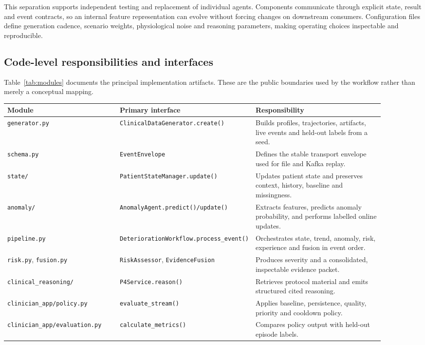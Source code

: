 \documentclass[11pt,a4paper]{article}
\begin{document}
This separation supports independent testing and replacement of individual agents. Components communicate through explicit state, result and event contracts, so an internal feature representation can evolve without forcing changes on downstream consumers. Configuration files define generation cadence, scenario weights, physiological noise and reasoning parameters, making operating choices inspectable and reproducible.

\subsection{Code-level responsibilities and interfaces}
Table~\ref{tab:modules} documents the principal implementation artifacts. These are the public boundaries used by the workflow rather than merely a conceptual mapping.

\begin{center}
\begin{tabular}{p{0.30\linewidth}p{0.25\linewidth}p{0.35\linewidth}}
\textbf{Module} & \textbf{Primary interface} & \textbf{Responsibility} \\
\hline
\texttt{generator.py} & \texttt{ClinicalDataGenerator.create()} & Builds profiles, trajectories, artifacts, live events and held-out labels from a seed. \\
\texttt{schema.py} & \texttt{EventEnvelope} & Defines the stable transport envelope used for file and Kafka replay. \\
\texttt{state/} & \texttt{PatientStateManager.update()} & Updates patient state and preserves context, history, baseline and missingness. \\
\texttt{anomaly/} & \texttt{AnomalyAgent.predict()/update()} & Extracts features, predicts anomaly probability, and performs labelled online updates. \\
\texttt{pipeline.py} & \texttt{DeteriorationWorkflow.process\_event()} & Orchestrates state, trend, anomaly, risk, experience and fusion in event order. \\
\texttt{risk.py}, \texttt{fusion.py} & \texttt{RiskAssessor}, \texttt{EvidenceFusion} & Produces severity and a consolidated, inspectable evidence packet. \\
\texttt{clinical\_reasoning/} & \texttt{P4Service.reason()} & Retrieves protocol material and emits structured cited reasoning. \\
\texttt{clinician\_app/policy.py} & \texttt{evaluate\_stream()} & Applies baseline, persistence, quality, priority and cooldown policy. \\
\texttt{clinician\_app/evaluation.py} & \texttt{calculate\_metrics()} & Compares policy output with held-out episode labels. \\
\end{tabular}
\end{center}
\end{document}
